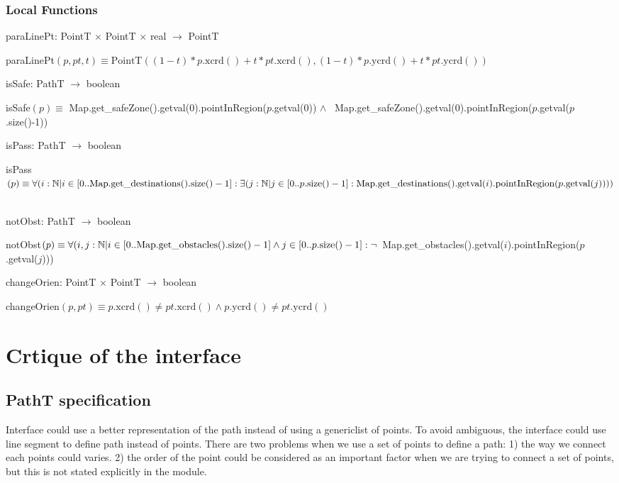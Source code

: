 \documentclass[12pt]{article}
\begin{document}
\subsubsection*{Local Functions}
paraLinePt: PointT $\times$ PointT $\times$ real $\rightarrow$ PointT

\noindent paraLinePt$(p,pt,t) \equiv \mbox{PointT} ((1-t) * p.\mbox{xcrd}() + t * pt.\mbox{xcrd}(), (1-t) * p.\mbox{ycrd}() + t * pt.\mbox{ycrd}())$ ~\newline

\noindent isSafe: PathT $\rightarrow$ boolean

\noindent isSafe$(p) \equiv$ Map.get\_safeZone().getval(0).pointInRegion($p$.getval(0)) $\wedge$ ~\newline Map.get\_safeZone().getval(0).pointInRegion($p$.getval($p$.size()-1)) ~\newline

\noindent isPass: PathT $\rightarrow$ boolean

\noindent isPass$(p) \equiv \forall (i : \mathbb{N} | i \in [0 .. \mbox{Map.get\_destinations().size()}-1] : ~\newline \exists (j : \mathbb{N} | j \in [ 0 .. p.\mbox{size}()-1] : \mbox{Map.get\_destinations().getval}(i).\mbox{pointInRegion}(p.\mbox{getval}(j))))$ ~\newline

\noindent notObst: PathT $\rightarrow$ boolean

\noindent notObst$(p) \equiv \forall (i,j : \mathbb{N} | i \in [0 .. \mbox{Map.get\_obstacles().size()}-1] \wedge ~\newline j \in [0 .. p.\mbox{size}()-1] : \neg$ Map.get\_obstacles().getval($i$).pointInRegion($p$.getval($j$))) ~\newline

\noindent changeOrien: PointT $\times$ PointT $\rightarrow$ boolean

\noindent changeOrien$(p,pt) \equiv p.\mbox{xcrd}() \neq pt.\mbox{xcrd}() \wedge p.\mbox{ycrd}() \neq pt.\mbox{ycrd}()$

\section*{Crtique of the interface}
\subsection*{PathT specification}
Interface could use a better representation of the path instead of using a genericlist of points. To avoid ambiguous, the interface could use line segment to define path instead of points. There are two problems when we use a set of points to define a path: 1) the way we connect each points could varies. 2) the order of the point could be considered as an important factor when we are trying to connect a set of points, but this is not stated explicitly in the module.
\end{document}
